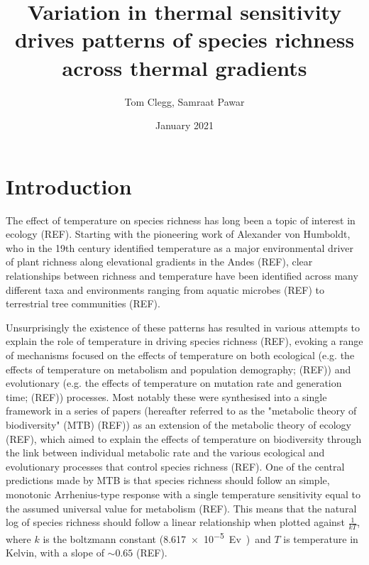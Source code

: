 \documentclass{article}
\title{Variation in thermal sensitivity drives patterns of species richness across thermal gradients}
\author{Tom Clegg, Samraat Pawar}
\date{January 2021}
\begin{document}
\maketitle

\section{Introduction}

The effect of temperature on species richness has long been a topic of interest in ecology (REF). Starting with the pioneering work of Alexander von Humboldt, who in the 19th century identified temperature as a major environmental driver of plant richness along elevational gradients in the Andes (REF), clear relationships between richness and temperature have been identified across many different taxa and environments ranging from aquatic microbes (REF) to terrestrial tree communities (REF). 

Unsurprisingly the existence of these patterns has resulted in various attempts to explain the role of temperature in driving species richness (REF), evoking a range of mechanisms focused on the effects of temperature on both ecological (e.g. the effects of temperature on metabolism and population demography; (REF)) and evolutionary (e.g. the effects of temperature on mutation rate and generation time; (REF)) processes. Most notably these were synthesised into a single framework in a series of papers (hereafter referred to as the "metabolic theory of biodiversity" (MTB) (REF)) as an extension of the metabolic theory of ecology (REF), which aimed to explain the effects of temperature on biodiversity through the link between individual metabolic rate and the various ecological and evolutionary processes that control species richness (REF). One of the central predictions made by MTB is that species richness should follow an simple, monotonic Arrhenius-type response with a single temperature sensitivity equal to the assumed universal value for metabolism (REF). This means that the natural log of species richness should follow a linear relationship when plotted against $\frac{1}{kT}$, where $k$ is the boltzmann constant (\SI{8.617e-5}Ev) and $T$ is temperature in Kelvin, with a slope of $\sim 0.65$ (REF).
\end{document}
